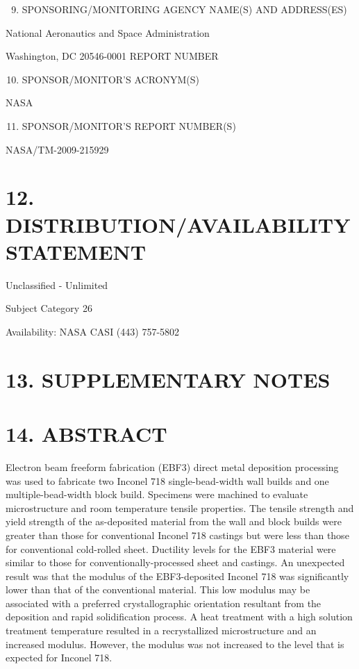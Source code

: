 \documentclass[10pt]{article}
\begin{document}
\begin{enumerate}
  \setcounter{enumi}{8}
  \item SPONSORING/MONITORING AGENCY NAME(S) AND ADDRESS(ES)
\end{enumerate}

National Aeronautics and Space Administration

Washington, DC 20546-0001 REPORT NUMBER

\begin{enumerate}
  \setcounter{enumi}{9}
  \item SPONSOR/MONITOR'S ACRONYM(S)
\end{enumerate}

NASA

\begin{enumerate}
  \setcounter{enumi}{10}
  \item SPONSOR/MONITOR'S REPORT NUMBER(S)
\end{enumerate}

NASA/TM-2009-215929

\section*{12. DISTRIBUTION/AVAILABILITY STATEMENT}
Unclassified - Unlimited

Subject Category 26

Availability: NASA CASI (443) 757-5802

\section*{13. SUPPLEMENTARY NOTES}
\section*{14. ABSTRACT}
Electron beam freeform fabrication (EBF3) direct metal deposition processing was used to fabricate two Inconel 718 single-bead-width wall builds and one multiple-bead-width block build. Specimens were machined to evaluate microstructure and room temperature tensile properties. The tensile strength and yield strength of the as-deposited material from the wall and block builds were greater than those for conventional Inconel 718 castings but were less than those for conventional cold-rolled sheet. Ductility levels for the EBF3 material were similar to those for conventionally-processed sheet and castings. An unexpected result was that the modulus of the EBF3-deposited Inconel 718 was significantly lower than that of the conventional material. This low modulus may be associated with a preferred crystallographic orientation resultant from the deposition and rapid solidification process. A heat treatment with a high solution treatment temperature resulted in a recrystallized microstructure and an increased modulus. However, the modulus was not increased to the level that is expected for Inconel 718.
\end{document}
